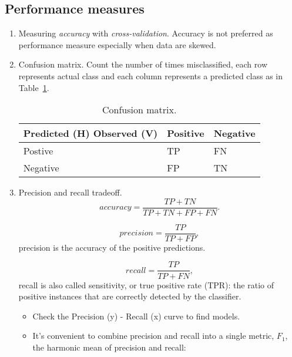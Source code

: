 \documentclass[12pt,oneside,a4paper]{article}
\numberwithin{equation}{section}
\begin{document}
\subsection{Performance measures}
\begin{enumerate}
\item Measuring \emph{accuracy} with \emph{cross-validation}. Accuracy is not preferred as performance measure especially when data are skewed. 

\item Confusion matrix. Count the number of times misclassified, each row represents actual class and each column represents a predicted class as in Table~\ref{confusion}.
\begin{table}[h]
	\centering
	\begin{tabular}{p{2.5cm}p{2cm}p{2cm}}
		Predicted (H) Observed (V)	&  Positive  & Negative \\
		\hline 
		Postive & TP & FN \\
		\hline 
		Negative & FP & TN \\
		\hline 
		
	\end{tabular}
	\caption{Confusion matrix.}
	\label{confusion}
\end{table}

\item Precision and recall tradeoff.\\


\begin{equation*}
accuracy = \frac{TP + TN}{TP + TN + FP + FN}.
\end{equation*}

\begin{equation*}
precision = \frac{TP}{TP + FP},
\end{equation*}
precision is the accuracy of the positive predictions.

\begin{equation*}
recall = \frac{TP}{TP + FN},
\end{equation*}
recall is also called sensitivity, or true positive rate (TPR): the ratio of positive instances that are correctly detected by the classifier. 

\begin{itemize}
\item Check the Precision (y) - Recall (x) curve to find models.
\item It's convenient to combine precision and recall into a single metric, $F_1$, the harmonic mean of precision and recall: 


\end{itemize}
\end{enumerate}
\end{document}
